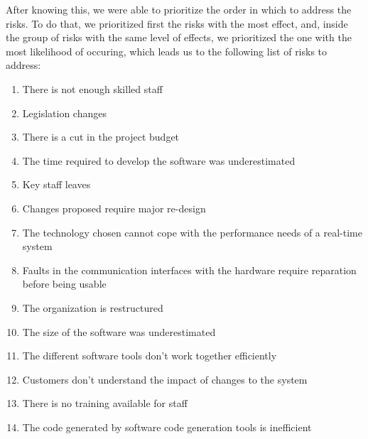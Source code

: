 After knowing this, we were able to prioritize the order in which to address the risks. To do that, we prioritized first the risks with the most effect, and, inside the group of risks with the same level of effects, we prioritized the one with the most likelihood of occuring, which leads us to the following list of risks to address:

\begin{enumerate}
    \item There is not enough skilled staff
    \item Legislation changes
    \item There is a cut in the project budget
    \item The time required to develop the software was underestimated
    \item Key staff leaves
    \item Changes proposed require major re-design
    \item The technology chosen cannot cope with the performance needs of a real-time system
    \item Faults in the communication interfaces with the hardware require reparation before being usable
    \item The organization is restructured
    \item The size of the software was underestimated
    \item The different software tools don't work together efficiently
    \item Customers don't understand the impact of changes to the system
    \item There is no training available for staff
    \item The code generated by software code generation tools is inefficient
\end{enumerate}